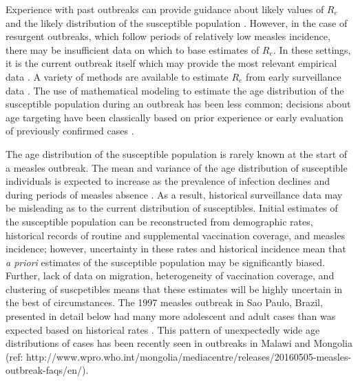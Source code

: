 Experience with past outbreaks can provide guidance about likely values
of \(R_{e}\) \cite{Durrheim_2014} and the likely distribution of the
susceptible population \cite{Goodson_2011, 25803382}. However, in
the case of resurgent outbreaks, which follow periods of relatively low
measles incidence, there may be insufficient data on which to base
estimates of \(R_e\). In these settings, it is the current outbreak itself which
may provide the most relevant empirical data \cite{Durrheim_2014, Merl_2009, Shea_2014}. A variety of methods are available to estimate \(R_{e}\) from early surveillance data \cite{Durrheim_2014,Chiew_2013,Ferrari_2005,Lipsitch_2003} . The use of mathematical modeling to estimate the age 
distribution of the susceptible population during an outbreak has been
less common; decisions about age targeting have been classically based
on prior experience or early evaluation of previously confirmed cases \cite{Minetti_2013a}.

The age distribution of the susceptible population is rarely known at
the start of a measles outbreak. The mean and variance of the age
distribution of susceptible individuals is expected to increase as the
prevalence of infection declines \cite{Goodson_2011, Ferrari_2013} and
during periods of measles absence \cite{Durrheim_2014}. As a result,
historical surveillance data may be misleading as to the current
distribution of susceptibles. Initial estimates of the susceptible
population can be reconstructed from demographic rates, historical
records of routine and supplemental vaccination coverage, and measles
incidence\cite{Takahashi_2015}; however, uncertainty in these rates and historical incidence
mean that \emph{a priori} estimates of the susceptible population may be
significantly biased. Further, lack of data on migration, heterogeneity of vaccination coverage, and clustering of suscpetibles means that these estimates will be highly uncertain in the best of circumstances. The 1997 measles outbreak in Sao Paulo, Brazil,
presented in detail below had many more adolescent and adult cases than
was expected based on historical rates \cite{Camargo_2000}. This pattern of
unexpectedly wide age distributions of cases has been recently seen in
outbreaks in Malawi \cite{Minetti_2013} and Mongolia (ref: http://www.wpro.who.int/mongolia/mediacentre/releases/20160505-measles-outbreak-faqs/en/).

